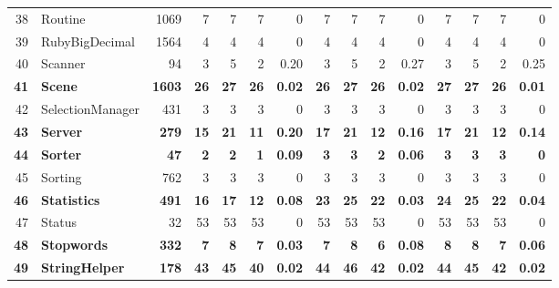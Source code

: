 \documentclass[conference]{IEEEtran}
\begin{document}
\begin{table} [htp!]
{\begin{tabularx}{0.91 \textwidth}{|r|l|r|r|r|r|r|r|r|r|r|r|r|r|r|}
38						& Routine					&1069		& 7		&	7	&	7	& 	0					& 7		&  7		& 7		& 		0			& 7			& 7			& 7			&	0	\\
39						& RubyBigDecimal			&1564		& 4 		&	4	&	4	& 	0					& 4		& 4 		& 4		& 		0			& 4			& 4			& 4			&	0\\      
40						& Scanner				&94			& 3		&	5	&	2	& 	0.20					& 3		& 5 		& 2		& 		0.27			& 3			& 5			& 2			&	0.25\\      
\textbf{41}						& \textbf{Scene}					&\textbf{1603}		& \textbf{26}		&	\textbf{27}	&	\textbf{26}	& 	\textbf{0.02}					& \textbf{26}		& \textbf{27} 		& \textbf{26}		& 		\textbf{0.02}			& \textbf{27}			& \textbf{27}			& \textbf{26}			&	\textbf{0.01}\\      
42						& SelectionManager			&431		& 3		&	3	&	3	& 	0					& 3		& 3 		& 3		& 		0			& 3			& 3			& 3			&	0\\      
\textbf{43}						& \textbf{Server}					&\textbf{279}		&\textbf{15}		&	\textbf{21}	&	\textbf{11}	& 	\textbf{0.20}					& \textbf{17}		& \textbf{21} 		& \textbf{12}		& 		\textbf{0.16}			& \textbf{17}			& \textbf{21}			& \textbf{12}			&	\textbf{0.14}\\      
\textbf{44}						& \textbf{Sorter}					&\textbf{47}			& \textbf{2}		&	\textbf{2}	&	\textbf{1}	& 	\textbf{0.09}					& \textbf{3}		& \textbf{3} 		& \textbf{2}		& 		\textbf{0.06}			&\textbf{3}			& \textbf{3}			& \textbf{3}			&	\textbf{0}\\      
45						& Sorting					&762		& 3		&	3	&	3	& 	0					& 3		& 3 		& 3		& 		0			& 3			& 3			& 3			&	0\\      
\textbf{46}						& \textbf{Statistics}				&\textbf{491}		& \textbf{16}		&	\textbf{17}	&	\textbf{12}	&	\textbf{0.08}					& \textbf{23}		& \textbf{25} 		& \textbf{22}		& 		\textbf{0.03}			& \textbf{24}			& \textbf{25}			& \textbf{22}			&	\textbf{0.04}\\      
47						& Status					&32			& 53		&	53	&	53	& 	0					& 53		& 53 		& 53		& 		0			& 53			& 53			& 53			&	0\\      
\textbf{48}						& \textbf{Stopwords}				&\textbf{332}		& \textbf{7}		&	\textbf{8}	&	\textbf{7}	& 	\textbf{0.03}					& \textbf{7}		&  \textbf{8}		& \textbf{6}		& 		\textbf{0.08}			& \textbf{8}			& \textbf{8}			& \textbf{7}			&	\textbf{0.06}\\      
\textbf{49}						& \textbf{StringHelper}				&\textbf{178}		& \textbf{43}	 	& 	\textbf{45}	&	\textbf{40}	& 	\textbf{0.02}					& \textbf{44}		&  \textbf{46}		& \textbf{42}		& 		\textbf{0.02}			& \textbf{44}			& \textbf{45}			& \textbf{42}			&	\textbf{0.02}\\      

\end{tabularx}}
\end{table}
\end{document}
